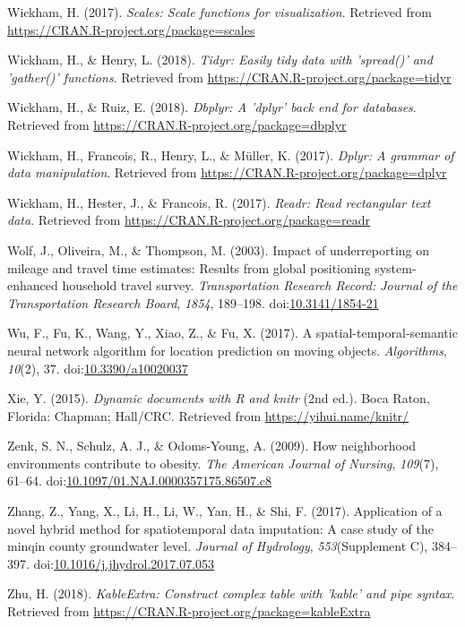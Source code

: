 \documentclass[man]{apa6}
\theoremstyle{definition}
\theoremstyle{definition}
\theoremstyle{definition}
\theoremstyle{remark}
\begin{document}
\hypertarget{ref-R-scales}{}
Wickham, H. (2017). \emph{Scales: Scale functions for visualization}.
Retrieved from \url{https://CRAN.R-project.org/package=scales}

\hypertarget{ref-R-tidyr}{}
Wickham, H., \& Henry, L. (2018). \emph{Tidyr: Easily tidy data with
'spread()' and 'gather()' functions}. Retrieved from
\url{https://CRAN.R-project.org/package=tidyr}

\hypertarget{ref-R-dbplyr}{}
Wickham, H., \& Ruiz, E. (2018). \emph{Dbplyr: A 'dplyr' back end for
databases}. Retrieved from
\url{https://CRAN.R-project.org/package=dbplyr}

\hypertarget{ref-R-dplyr}{}
Wickham, H., Francois, R., Henry, L., \& Müller, K. (2017). \emph{Dplyr:
A grammar of data manipulation}. Retrieved from
\url{https://CRAN.R-project.org/package=dplyr}

\hypertarget{ref-R-readr}{}
Wickham, H., Hester, J., \& Francois, R. (2017). \emph{Readr: Read
rectangular text data}. Retrieved from
\url{https://CRAN.R-project.org/package=readr}

\hypertarget{ref-wolf_impact_2003}{}
Wolf, J., Oliveira, M., \& Thompson, M. (2003). Impact of underreporting
on mileage and travel time estimates: Results from global positioning
system-enhanced household travel survey. \emph{Transportation Research
Record: Journal of the Transportation Research Board}, \emph{1854},
189--198. doi:\href{https://doi.org/10.3141/1854-21}{10.3141/1854-21}

\hypertarget{ref-wu_spatial-temporal-semantic_2017}{}
Wu, F., Fu, K., Wang, Y., Xiao, Z., \& Fu, X. (2017). A
spatial-temporal-semantic neural network algorithm for location
prediction on moving objects. \emph{Algorithms}, \emph{10}(2), 37.
doi:\href{https://doi.org/10.3390/a10020037}{10.3390/a10020037}

\hypertarget{ref-R-knitr}{}
Xie, Y. (2015). \emph{Dynamic documents with R and knitr} (2nd ed.).
Boca Raton, Florida: Chapman; Hall/CRC. Retrieved from
\url{https://yihui.name/knitr/}

\hypertarget{ref-zenk_how_2009}{}
Zenk, S. N., Schulz, A. J., \& Odoms-Young, A. (2009). How neighborhood
environments contribute to obesity. \emph{The American Journal of
Nursing}, \emph{109}(7), 61--64.
doi:\href{https://doi.org/10.1097/01.NAJ.0000357175.86507.c8}{10.1097/01.NAJ.0000357175.86507.c8}

\hypertarget{ref-zhang_application_2017}{}
Zhang, Z., Yang, X., Li, H., Li, W., Yan, H., \& Shi, F. (2017).
Application of a novel hybrid method for spatiotemporal data imputation:
A case study of the minqin county groundwater level. \emph{Journal of
Hydrology}, \emph{553}(Supplement C), 384--397.
doi:\href{https://doi.org/10.1016/j.jhydrol.2017.07.053}{10.1016/j.jhydrol.2017.07.053}

\hypertarget{ref-R-kableExtra}{}
Zhu, H. (2018). \emph{KableExtra: Construct complex table with 'kable'
and pipe syntax}. Retrieved from
\url{https://CRAN.R-project.org/package=kableExtra}

\endgroup
\end{document}
